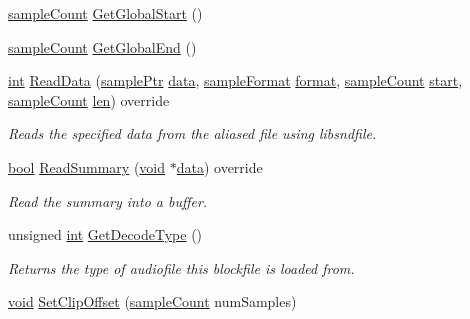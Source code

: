 \begin{DoxyCompactItemize}
\hyperlink{include_2audacity_2_types_8h_afa427e1f521ea5ec12d054e8bd4d0f71}{sample\+Count} \hyperlink{class_o_d_decode_block_file_a3dd300facf88afaa3254fcd034db9376}{Get\+Global\+Start} ()
\item 
\hyperlink{include_2audacity_2_types_8h_afa427e1f521ea5ec12d054e8bd4d0f71}{sample\+Count} \hyperlink{class_o_d_decode_block_file_a4b6f8f125e61d7beab36bf8331e07f1a}{Get\+Global\+End} ()
\item 
\hyperlink{xmltok_8h_a5a0d4a5641ce434f1d23533f2b2e6653}{int} \hyperlink{class_o_d_decode_block_file_a505cd171227fd1cd7e21faf9131289b3}{Read\+Data} (\hyperlink{include_2audacity_2_types_8h_aaafb46d1caf7c79262fec96b577215fe}{sample\+Ptr} \hyperlink{lib_2expat_8h_ac39e72a1de1cb50dbdc54b08d0432a24}{data}, \hyperlink{include_2audacity_2_types_8h_a9938d2e2f6adef23e745cd80ef379792}{sample\+Format} \hyperlink{_export_p_c_m_8cpp_a317afff57d87a89158c2b038d37b2b08}{format}, \hyperlink{include_2audacity_2_types_8h_afa427e1f521ea5ec12d054e8bd4d0f71}{sample\+Count} \hyperlink{seqread_8c_ac503262ae470564980711da4f78b1181}{start}, \hyperlink{include_2audacity_2_types_8h_afa427e1f521ea5ec12d054e8bd4d0f71}{sample\+Count} \hyperlink{lib_2expat_8h_af86d325fecfc8f47b61fbf5a5146f582}{len}) override
\begin{DoxyCompactList}\small\item\em Reads the specified data from the aliased file using libsndfile. \end{DoxyCompactList}\item 
\hyperlink{mac_2config_2i386_2lib-src_2libsoxr_2soxr-config_8h_abb452686968e48b67397da5f97445f5b}{bool} \hyperlink{class_o_d_decode_block_file_acc66b00623b395802e3f339df2673239}{Read\+Summary} (\hyperlink{sound_8c_ae35f5844602719cf66324f4de2a658b3}{void} $\ast$\hyperlink{lib_2expat_8h_ac39e72a1de1cb50dbdc54b08d0432a24}{data}) override
\begin{DoxyCompactList}\small\item\em Read the summary into a buffer. \end{DoxyCompactList}\item 
unsigned \hyperlink{xmltok_8h_a5a0d4a5641ce434f1d23533f2b2e6653}{int} \hyperlink{class_o_d_decode_block_file_ae3e3b793c7d7371f45b1fb1ebf3aa524}{Get\+Decode\+Type} ()
\begin{DoxyCompactList}\small\item\em Returns the type of audiofile this blockfile is loaded from. \end{DoxyCompactList}\item 
\hyperlink{sound_8c_ae35f5844602719cf66324f4de2a658b3}{void} \hyperlink{class_o_d_decode_block_file_ab1166dee2c082d48aa8d454aa83a4fb7}{Set\+Clip\+Offset} (\hyperlink{include_2audacity_2_types_8h_afa427e1f521ea5ec12d054e8bd4d0f71}{sample\+Count} num\+Samples)

\end{DoxyCompactItemize}
